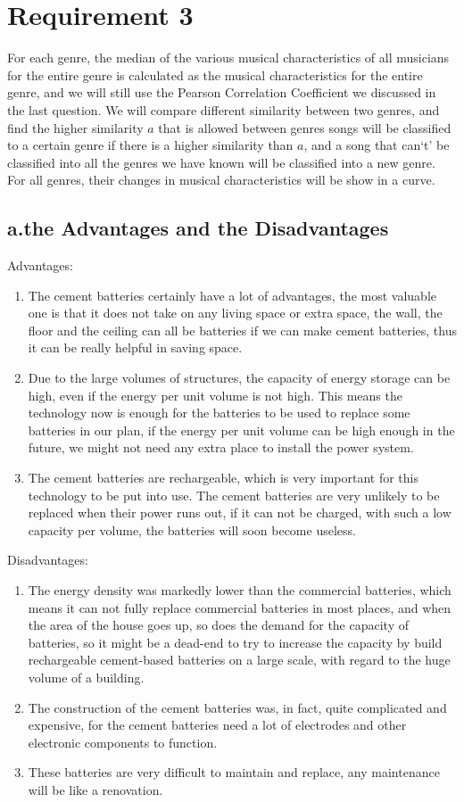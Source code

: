 \documentclass{article}
\begin{document}
\section{Requirement 3}
For each genre, the median of the various musical characteristics of all musicians for the entire genre is calculated as the musical characteristics
for the entire genre, and we will still use the Pearson Correlation Coefficient we discussed in the last question. We will compare different similarity between two
genres, and find the higher similarity $a$ that is allowed between genres songs will be classified to a certain genre if there is a higher similarity than $a$, and a song
that can`t' be classified into all the genres we have known will be classified into a new genre. For all genres, their changes in musical characteristics will be show in
a curve.
\subsection{a.the Advantages and the Disadvantages}
Advantages:
\begin{enumerate}
    \item The cement batteries certainly have a lot of advantages, the most valuable one is that it does not take on any living space or extra space, the wall, the floor and the ceiling can all be batteries if we can make cement batteries,
          thus it can be really helpful in saving space.
    \item Due to the large volumes of structures, the capacity of energy storage can be high, even if the energy per unit volume is not high. This means the technology now is enough for the batteries to be used to replace some batteries in our plan, if the energy per unit volume can be high enough in the future, we might not need any extra place to install the power system.
    \item The cement batteries are rechargeable, which is very important for this technology to be put into use. The cement batteries are very unlikely to be replaced when their power runs out, if it can not be charged, with such a low capacity per volume, the batteries will soon become useless.
\end{enumerate}
Disadvantages:
\begin{enumerate}
    \item The energy density was markedly lower than the commercial batteries, which means it can not fully replace commercial batteries in most places, and when the area of the house goes up, so does the demand for the capacity of batteries, so it might be a dead-end to try to increase the capacity by build rechargeable cement-based batteries on a
          large scale, with regard to the huge volume of a building.
    \item The construction of the cement batteries was, in fact, quite complicated and expensive, for the cement batteries need a lot of electrodes and other electronic components to function.

    \item These batteries are very difficult to maintain and replace, any maintenance will be like a renovation.
\end{enumerate}
\end{document}
